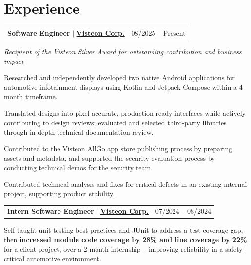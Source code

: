 \documentclass[a4paper, 11pt]{article}
\makeatletter
\newcommand{\resumeProjectHeading}[2]{
  \item
  \begin{tabular*}{1.0\textwidth}[t]{l@{\extracolsep{\fill}}r}
    #1 & #2
  \end{tabular*}
}
\makeatother
\begin{document}
\section{Experience}
\begin{outerlist}
    \resumeProjectHeading
      {\textbf{Software Engineer} $|$ \textbf{\href{https://www.visteon.com}{\underline{Visteon Corp.}}}}{08/2025 -- Present}
    \textit{\href{https://lnkd.in/p/dYJk2gRm}{\underline{Recipient of the Visteon Silver Award}} for outstanding contribution and business impact}
    \begin{innerlist}
      \item Researched and independently developed two native Android applications for automotive infotainment displays using Kotlin and Jetpack Compose within a 4-month timeframe.
      \item Translated designs into pixel-accurate, production-ready interfaces while actively contributing to design reviews; evaluated and selected third-party libraries through in-depth technical documentation review.
      \item Contributed to the Visteon AllGo app store publishing process by preparing assets and metadata, and supported the security evaluation process by conducting technical demos for the security team.
      \item Contributed technical analysis and fixes for critical defects in an existing internal project, supporting product stability.
    \end{innerlist}

    \resumeProjectHeading
      {\textbf{Intern Software Engineer} $|$ \textbf{\href{https://www.visteon.com}{\underline{Visteon Corp.}}}}{07/2024 -- 08/2024}
    \begin{innerlist}
      \item Self-taught unit testing best practices and JUnit to address a test coverage gap, then \textbf{increased module code coverage by 28\% and line coverage by 22\%} for a client project, over a 2-month internship -- improving reliability in a safety-critical automotive environment.
    \end{innerlist}
\end{outerlist}

\end{document}
